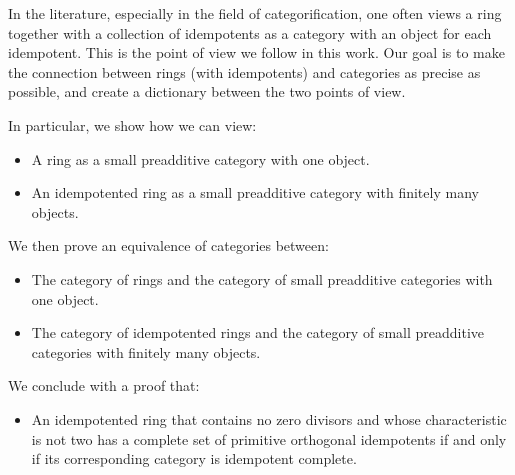 In the literature, especially in the field of categorification, one often views a ring together
with a collection of idempotents as a category with an object for each idempotent. This is the
point of view we follow in this work. Our goal is to make the connection between rings
(with idempotents) and categories as precise as possible,  and create a dictionary between
the two points of view.  

In particular, we show how we can view:

\begin{itemize}
\item A ring as a small preadditive
category  with  one  object.
\item An  idempotented  ring  as  a  small  preadditive  category  with
finitely many objects.
\end{itemize}  

We then prove an equivalence of categories between:

\begin{itemize}
\item The category of rings and the category of small preadditive categories with one object.
\item The category of idempotented rings and the category of small preadditive categories
with finitely many objects.
\end{itemize}

We conclude with a proof that:

\begin{itemize}
\item An idempotented ring that contains
no zero divisors and whose characteristic is not two has a complete set of primitive orthogonal
idempotents if and only if its corresponding category is idempotent complete.
\end{itemize} 

